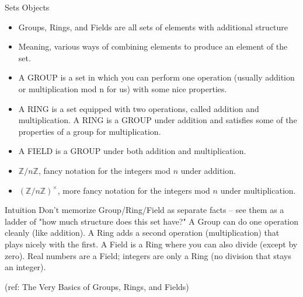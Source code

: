 \begin{frame}{Sets Objects}
\begin{itemize}
\item Groups, Rings, and Fields are  all sets of elements with additional structure
\item Meaning, various ways of combining elements to produce an element of the set. 
\item A GROUP is a set in which you can perform one operation (usually
addition or multiplication mod n for us) with some nice properties. 
\item A RING is a set equipped with two operations, called addition and multiplication. A RING is a GROUP under addition
and satisfies some of the properties of a group for multiplication. 
\item A FIELD is a GROUP under both addition and multiplication.

\item ${\mathbb Z} / n {\mathbb Z}$, fancy notation for the integers mod $n$ under addition.
\item $({\mathbb Z} / n {\mathbb Z})^\times$, more fancy notation for the integers mod $n$ under multiplication.
\end{itemize}

\begin{block}{Intuition}
Don't memorize Group/Ring/Field as separate facts -- see them as a ladder of "how much structure does this set have?" A Group can do one operation cleanly (like addition). A Ring adds a second operation (multiplication) that plays nicely with the first. A Field is a Ring where you can also divide (except by zero). Real numbers are a Field; integers are only a Ring (no division that stays an integer).
\end{block}

\tiny{(ref: The Very Basics of Groups, Rings, and Fields)}

\end{frame}

